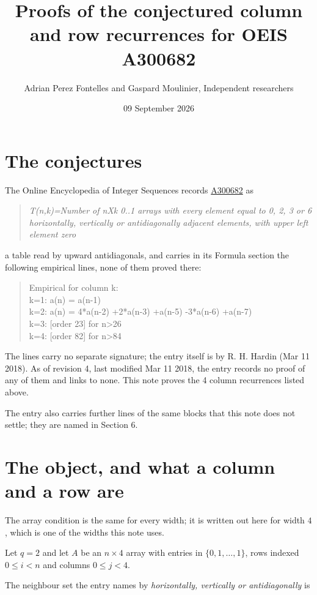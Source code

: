 \documentclass[11pt]{article}
\title{Proofs of the conjectured column and row recurrences for OEIS A300682}
\author{Adrian Perez Fontelles and Gaspard Moulinier, Independent researchers}
\date{09 September 2026}
\theoremstyle{definition}
\begin{document}
\maketitle
\section{The conjectures}

The Online Encyclopedia of Integer Sequences records \href{https://oeis.org/A300682}{A300682} as

\begin{quote}\itshape T(n,k)=Number of nXk 0..1 arrays with every element equal to 0, 2, 3 or 6 horizontally, vertically or antidiagonally adjacent elements, with upper left element zero\end{quote}

a table read by upward antidiagonals, and carries in its Formula section the following empirical lines, none of them proved there:

\begin{quote}\ttfamily Empirical for column k:\\
k=1: a(n) = a(n-1)\\k=2: a(n) = 4*a(n-2) +2*a(n-3) +a(n-5) -3*a(n-6) +a(n-7)\\k=3: [order 23] for n>26\\k=4: [order 82] for n>84\end{quote}

The lines carry no separate signature; the entry itself is by R. H. Hardin (Mar 11 2018). As of revision 4, last modified Mar 11 2018, the entry records no proof of any of them and links to none. This note proves the 4 column recurrences listed above.

The entry also carries further lines of the same blocks that this note does not settle; they are named in Section 6.

\section{The object, and what a column and a row are}

The array condition is the same for every width; it is written out here for width $4$, which is one of the widths this note uses.

Let $q = 2$ and let $A$ be an $n \times 4$ array with entries in $\{0,1,\dots,1\}$, rows indexed $0 \le i < n$ and columns $0 \le j < 4$.

The neighbour set the entry names by {\itshape horizontally, vertically or antidiagonally} is
\end{document}
